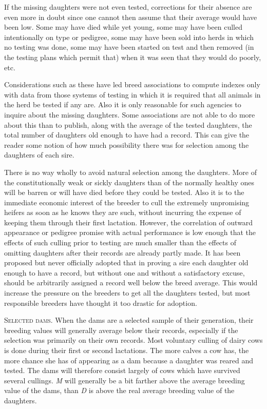 If the missing daughters were not even tested, corrections for their
absence are even more in doubt since one cannot then assume that their
average would have been low. Some may have died while yet young,
some may have been culled intentionally on type or pedigree, some
may have been sold into herds in which no testing was done, some may
have been started on test and then removed (in the testing plans which
permit that) when it was seen that they would do poorly, etc.

Considerations such as these have led breed associations to compute
indexes only with data from those systems of testing in which it is
required that all animals in the herd be tested if any are. Also it is only
reasonable for such agencies to inquire about the missing daughters.
Some associations are not able to do more about this than to publish,
along with the average of the tested daughters, the total number of
daughters old enough to have had a record. This can give the reader
some notion of how much possibility there was for selection among the
daughters of each sire.

There is no way wholly to avoid natural selection among the daughters.
More of the constitutionally weak or sickly daughters than of the
normally healthy ones will be barren or will have died before they
could be tested. Also it is to the immediate economic interest of the
breeder to cull the extremely unpromising heifers as soon as he knows
they are such, without incurring the expense of keeping them through
their first lactation. However, the correlation of outward appearance
or pedigree promise with actual performance is low enough that the
effects of such culling prior to testing are much smaller than the effects
of omitting daughters after their records are already partly made. It
has been proposed but never officially adopted that in proving a sire
each daughter old enough to have a record, but without one and without
a satisfactory excuse, should be arbitrarily assigned a record well
below the breed average. This would increase the pressure on the
breeders to get all the daughters tested, but most responsible breeders
have thought it too drastic for adoption.

\textsc{Selected dams}. When the dams are a selected sample of their
generation, their breeding values will generally average below their
records, especially if the selection was primarily on their own records.
Most voluntary culling of dairy cows is done during their first or second
lactations. The more calves a cow has, the more chance she has of
appearing as a dam because a daughter was reared and tested. The
dams will therefore consist largely of cows which have survived several
cullings. \textit{M} will generally be a bit farther above the average
breeding value of the dams, than \textit{D} is above the real average
breeding value of the daughters.
\noclub

